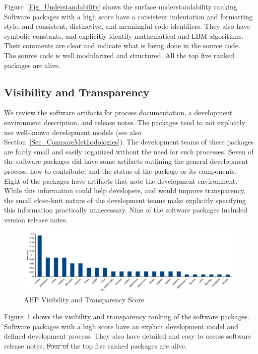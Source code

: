 \documentclass[final, 3p, times, authoryear]{elsarticle}
\providecommand{\DIFaddtex}[1]{{\protect\color{blue}\uwave{#1}}} %
\providecommand{\DIFdeltex}[1]{{\protect\color{red}\sout{#1}}}                      %
\providecommand{\DIFaddbegin}{} %
\providecommand{\DIFaddend}{} %
\providecommand{\DIFdelbegin}{} %
\providecommand{\DIFdelend}{} %
\providecommand{\DIFadd}[1]{\texorpdfstring{\DIFaddtex{#1}}{#1}} %
\providecommand{\DIFdel}[1]{\texorpdfstring{\DIFdeltex{#1}}{}} %
\begin{document}
Figure~\ref{Fig_Understandability} shows the surface understandability ranking.
Software packages with a high score have a consistent indentation and formatting
style, and consistent, distinctive, and meaningful code identifiers. They also
have symbolic constants, and explicitly identify mathematical and LBM
algorithms. Their comments are clear and indicate what is being done in the
source code. The source code is well modularized and structured. All the top
five ranked packages are alive.

\subsection{Visibility and Transparency}

We review the software artifacts for process documentation, a development
environment description, and release notes.  The packages tend to not explicitly
use well-known development models (see also
Section~\ref{Sec_CompareMethodologies}). The development teams of these packages
are fairly small and easily organized without the need for such processes. Seven
of the software packages did have some artifacts outlining the general
development process, how to contribute, and the status of the package or its
components. Eight of the packages have artifacts that note the development
environment. While this information could help developers, and would improve
transparency, the small close-knit nature of the development teams make
explicitly specifying this information practically unnecessary. Nine of the
software packages included version release notes.

\begin{figure}[h!]
	\begin{center}
		\includegraphics[width=1.0\textwidth]{./figures/visibilitytransparency_chart.pdf}
		\caption{AHP Visibility and Transparency Score}
		\label{Fig_VisibilityTransparency}
	\end{center}
\end{figure}

Figure~\ref{Fig_VisibilityTransparency} shows the visibility and transparency
ranking of the software packages. Software packages with a high score have an
explicit development model and defined development process. They also have
detailed and easy to access software release notes. \DIFdelbegin \DIFdel{Four of }\DIFdelend \DIFaddbegin \DIFadd{All }\DIFaddend the top five ranked
packages are alive.
\end{document}

